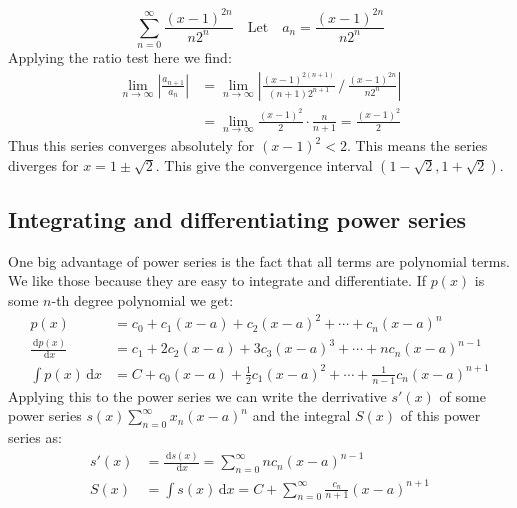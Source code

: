\documentclass[11pt, a4paper]{article}
\renewcommand*{\d}{\,\text{d}}
\numberwithin{equation}{section}
\numberwithin{figure}{section}
\begin{document}
\begin{equation*}
    \sum_{n=0}^\infty \frac{(x-1)^{2n}}{n2^n} \quad \text{Let} \quad a_n = \frac{(x-1)^{2n}}{n2^n}
\end{equation*}
Applying the ratio test here we find:
\begin{align*}
    \lim_{n\to\infty} \left| \frac{a_{n+1}}{a_n} \right| &= \lim_{n\to\infty} \left| \frac{(x-1)^{2(n+1)}}{(n+1)2^{n+1}} \,\Big/\, \frac{(x-1)^{2n}}{n2^n} \right|\\  
    &= \lim_{n\to\infty} \frac{(x-1)^2}{2}\cdot\frac{n}{n+1} = \frac{(x-1)^2}{2}
\end{align*}
Thus this series converges absolutely for $(x-1)^2 < 2$. This means the series diverges for $x = 1\pm \sqrt{2}$. This give the convergence interval $(1-\sqrt{2}, 1 + \sqrt{2})$.


\subsection{Integrating and differentiating power series}
One big advantage of power series is the fact that all terms are polynomial terms. We like those because they are easy to integrate and differentiate. If $p(x)$ is some $n$-th degree polynomial we get:
\begin{align}
  p(x) &= c_0 + c_1(x-a) + c_2(x-a)^2 + \cdots + c_n(x-a)^n\\
  \frac{\d p(x)}{\d x} &= c_1 + 2c_2(x-a) + 3c_3(x-a)^3 + \cdots + nc_n(x-a)^{n-1}\\
  \int p(x)\d x &= C + c_0(x-a) + \frac{1}{2}c_1(x-a)^2 + \cdots + \frac{1}{n-1}c_n (x-a)^{n+1}
\end{align}
Applying this to the power series we can write the derrivative $s'(x)$ of some power series $s(x) \sum_{n=0}^\infty x_n(x-a)^n$ and the integral $S(x)$ of this power series as:
\begin{align}
  s'(x) &= \frac{\d s(x)}{\d x} = \sum_{n=0}^\infty nc_n(x-a)^{n-1}\\
  S(x) &= \int s(x)\d x = C + \sum_{n=0}^\infty \frac{c_n}{n+1}(x-a)^{n+1}
\end{align} 
\end{document}
